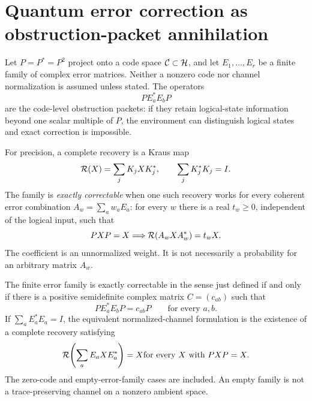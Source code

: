 \section{Quantum error correction as obstruction-packet annihilation}\label{core:section:008}

Let $P=P^*=P^2$ project onto a code space $\cC\subset\cH$, and let $E_1,\ldots,E_r$ be a finite family of complex error matrices. Neither a nonzero code nor channel normalization is assumed unless stated. The operators
\[
P E_a^*E_bP
\]
are the code-level obstruction packets: if they retain logical-state information beyond one scalar multiple of $P$, the environment can distinguish logical states and exact correction is impossible.

For precision, a complete recovery is a Kraus map
\[
\cR(X)=\sum_jK_jXK_j^*,\qquad \sum_jK_j^*K_j=I.
\]
The family is \emph{exactly correctable} when one such recovery works for every coherent error combination $A_w=\sum_aw_aE_a$: for every $w$ there is a real $t_w\ge0$, independent of the logical input, such that
\[
PXP=X\quad\Longrightarrow\quad
\cR(A_wXA_w^*)=t_wX.
\]
The coefficient is an unnormalized weight. It is not necessarily a probability for an arbitrary matrix $A_w$.

\begin{classical}\label{core:classical:003}\label{core:thm:kl}
The finite error family is exactly correctable in the sense just defined if and only if there is a positive semidefinite complex matrix $C=(c_{ab})$ such that
\[
\boxed{PE_a^*E_bP=c_{ab}P\qquad\text{for every }a,b.}
\]
If $\sum_aE_a^*E_a=I$, the equivalent normalized-channel formulation is the existence of a complete recovery satisfying
\[
\cR\!\left(\sum_aE_aXE_a^*\right)=X
\quad\text{for every }X\text{ with }PXP=X.
\]
The zero-code and empty-error-family cases are included. An empty family is not a trace-preserving channel on a nonzero ambient space.
\end{classical}

